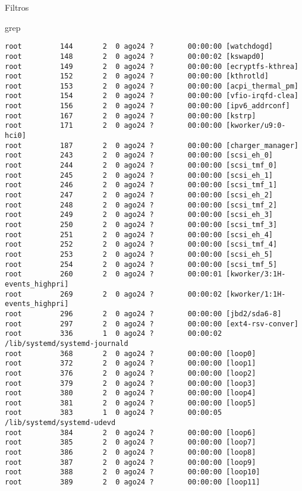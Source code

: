 \begin{section}{Filtros}
\begin{subsection}{grep}
\begin{lstlisting}[style=Ubuntu]
root         144       2  0 ago24 ?        00:00:00 [watchdogd]
root         148       2  0 ago24 ?        00:00:02 [kswapd0]
root         149       2  0 ago24 ?        00:00:00 [ecryptfs-kthrea]
root         152       2  0 ago24 ?        00:00:00 [kthrotld]
root         153       2  0 ago24 ?        00:00:00 [acpi_thermal_pm]
root         154       2  0 ago24 ?        00:00:00 [vfio-irqfd-clea]
root         156       2  0 ago24 ?        00:00:00 [ipv6_addrconf]
root         167       2  0 ago24 ?        00:00:00 [kstrp]
root         171       2  0 ago24 ?        00:00:00 [kworker/u9:0-hci0]
root         187       2  0 ago24 ?        00:00:00 [charger_manager]
root         243       2  0 ago24 ?        00:00:00 [scsi_eh_0]
root         244       2  0 ago24 ?        00:00:00 [scsi_tmf_0]
root         245       2  0 ago24 ?        00:00:00 [scsi_eh_1]
root         246       2  0 ago24 ?        00:00:00 [scsi_tmf_1]
root         247       2  0 ago24 ?        00:00:00 [scsi_eh_2]
root         248       2  0 ago24 ?        00:00:00 [scsi_tmf_2]
root         249       2  0 ago24 ?        00:00:00 [scsi_eh_3]
root         250       2  0 ago24 ?        00:00:00 [scsi_tmf_3]
root         251       2  0 ago24 ?        00:00:00 [scsi_eh_4]
root         252       2  0 ago24 ?        00:00:00 [scsi_tmf_4]
root         253       2  0 ago24 ?        00:00:00 [scsi_eh_5]
root         254       2  0 ago24 ?        00:00:00 [scsi_tmf_5]
root         260       2  0 ago24 ?        00:00:01 [kworker/3:1H-events_highpri]
root         269       2  0 ago24 ?        00:00:02 [kworker/1:1H-events_highpri]
root         296       2  0 ago24 ?        00:00:00 [jbd2/sda6-8]
root         297       2  0 ago24 ?        00:00:00 [ext4-rsv-conver]
root         336       1  0 ago24 ?        00:00:02 /lib/systemd/systemd-journald
root         368       2  0 ago24 ?        00:00:00 [loop0]
root         372       2  0 ago24 ?        00:00:00 [loop1]
root         376       2  0 ago24 ?        00:00:00 [loop2]
root         379       2  0 ago24 ?        00:00:00 [loop3]
root         380       2  0 ago24 ?        00:00:00 [loop4]
root         381       2  0 ago24 ?        00:00:00 [loop5]
root         383       1  0 ago24 ?        00:00:05 /lib/systemd/systemd-udevd
root         384       2  0 ago24 ?        00:00:00 [loop6]
root         385       2  0 ago24 ?        00:00:00 [loop7]
root         386       2  0 ago24 ?        00:00:00 [loop8]
root         387       2  0 ago24 ?        00:00:00 [loop9]
root         388       2  0 ago24 ?        00:00:00 [loop10]
root         389       2  0 ago24 ?        00:00:00 [loop11]

\end{lstlisting}
\end{subsection}
\end{section}
